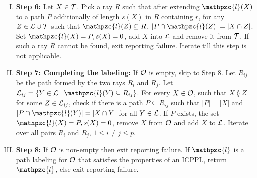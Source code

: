 \documentclass[envcountsect, envcountsame, 11pt]{../lib/llncs2e/llncs}
\def\cL{{\cal L}}
\def\cO{{\cal O}}
\def\cT{{\cal T}}
\def\cl{\mathpzc{l}}
\def\overlap{\between}
\begin{document}
\begin{enumerate}[I.]
   \item {\bf Step 6:} Let $X \in \cT$.  Pick a ray $R$ such that after extending $\cl(X)$ to a path $P$ additionally of length $s(X)$ in $R$ containing $r$, for any $Z \in \cL \cup \cT$ such that $\cl(Z) \subseteq R$, $|P \cap \cl(Z)| = |X \cap Z|$.  Set $\cl(X)= P, s(X)=0$, add $X$ into $\cL$ and remove it from $\cT$.  If such a ray $R$ cannot be found, exit reporting failure.   Iterate till this step is not applicable. 
 \item {\bf Step 7: Completing the labeling:} If $\cO$ is empty, skip to Step 8.  Let $R_{ij}$ be the path formed by the two rays $R_i$ and $R_j$.  Let $\cL_{ij} = \{Y \in \cL  \mid \cl(Y) \subseteq R_{ij}\}$.  For every $X \in \cO$,  such that $X \overlap Z$ for some $Z \in \cL_{ij}$, check if there is a  path $P \subseteq R_{ij}$ such that $|P|=|X|$ and $|P \cap \cl(Y)| = |X \cap Y|$ for all $Y \in \cL$.   If $P$ exists, the set $\cl(X)=P, s(X)=0$, remove $X$ from $\cO$ and add $X$ to $\cL$.  Iterate over all pairs $R_i$ and $R_j$, $1 \leq i \neq j \leq p$.
 \item {\bf Step 8:} If $\cO$ is non-empty then exit reporting failure.  If $\cl$ is a path labeling for $\cO$ that satisfies the properties of an ICPPL, return $\cl$, else exit reporting failure.
  \end{enumerate}
  
\end{document}
